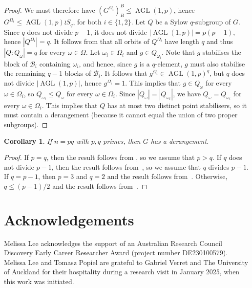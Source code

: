 \documentclass[11pt,a4paper]{amsart}
\newtheorem{corollary}[theorem]{Corollary}
\theoremstyle{definition}
\DeclareMathOperator{\AGL}{AGL}
\begin{document}
\begin{proof}
We must therefore have $(G^{\Omega_i})_B^B \leq \AGL(1,p)$, hence $G^{\Omega_i}\leq \AGL(1,p)\wr S_q$, for both $i\in\{1,2\}$. Let $Q$ be a Sylow $q$-subgroup of $G$. Since $q$ does not divide $p-1$, it does not divide $|\AGL(1,p)|=p(p-1)$, hence $|Q^{\Omega_i}|=q$. It follows from  that all orbits of $Q^{\Omega_i}$  have length $q$ and thus $|Q:Q_\omega|=q$ for every $\omega\in\Omega$. Let $\omega_i\in\Omega_i$ and $g\in Q_{\omega_i}$. Note that $g$ stabilises the block of $\mathcal{B}_i$ containing $\omega_i$, and hence, since $g$ is a $q$-element, $g$ must also stabilise the remaining $q-1$ blocks of $\mathcal{B}_i$. It follows that $g^{\Omega_i}\in\AGL(1,p)^q$, but $q$ does not divide $|\AGL(1,p)|$, hence  $g^{\Omega_i}=1$. This implies that $g\in Q_\omega$ for every $\omega\in\Omega_i$, so $Q_{\omega_i} \leq Q_\omega$ for every $\omega \in \Omega_i$. Since $|Q_\omega|=|Q_{\omega_i}|$, we have $Q_\omega=Q_{\omega_i}$ for every $\omega\in\Omega_i$. This implies that $Q$ has at most two distinct point stabilisers, so it must contain a derangement (because it cannot equal the union of two proper subgroups).
\end{proof}

\begin{corollary} \label{mainCor}
If $n=pq$ with $p,q$ primes, then $G$ has a derangement.
\end{corollary}
\begin{proof}
If $p=q$, then the result follows from , so we assume that $p>q$. If $q$ does not divide $p-1$, then the result follows from~, so we  assume  that $q$ divides $p-1$. If $q=p-1$, then $p=3$ and $q=2$ and the result follows from~. Otherwise, $q\leq (p-1)/2$ and the result follows from~.
\end{proof}



\section*{Acknowledgements}
Melissa Lee acknowledges the support of an Australian Research Council Discovery Early Career Researcher Award (project number DE230100579). Melissa Lee and Tomasz Popiel are grateful to Gabriel Verret and The University of Auckland for their hospitality during a research visit in January 2025, when this work was initiated.



\end{document}

